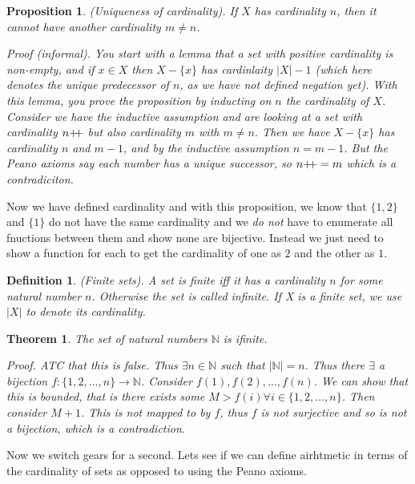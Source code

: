 \documentclass{article}
\newtheorem{definition}{Definition}[subsection]
\newtheorem{proposition}{Proposition}[subsection]
\newtheorem{theorem}{Theorem}[subsection]
\newcommand{\N}{\mathbb{N}}
\newcommand{\pp}{\mathbin{+\mkern-5mu+}}
\let\it\textit
\begin{document}
\begin{proposition}
	(Uniqueness of cardinality). If $X$ has cardinality $n$, then 
	it cannot have another cardinality $m \neq n$.

	\it{Proof} (informal). You start with a lemma that a set 
		with positive cardinality is non-empty, and if $x \in X$ 
		then $X - \{x\}$ has cardinlaity $|X| - 1$ (which here
		denotes the unique predecessor of $n$, as we have not
		defined negation yet). With this lemma, you prove the 
		proposition by inducting on $n$ the cardinality 
		of $X$. Consider we have the inductive assumption 
		and are looking at a set with cardinality $n\pp$ but
		also cardinality $m$ with $m \neq n$. Then we have
		$X - \{x\}$ has cardinality $n$ and $m-1$, and by the 
		inductive assumption $n=m-1$. But the Peano 
		axioms say each number has a unique successor, so $n\pp = m$
		which is a contradiciton.
\end{proposition}

Now we have defined cardinality and with this proposition, 
we know that $\{1,2\}$ and $\{1\}$ do not have the same cardinality 
and we \it{do not} have to enumerate all fnuctions between them 
and show none are bijective. Instead we just need to show 
a function for each to get the cardinality of one as $2$ 
and the other as $1$.

\begin{definition}
	(Finite sets). A set is finite iff it has a 
	cardinality $n$ for some natural number $n$.
	Otherwise the set is called infinite. If X is
	a finite set, we use $|X|$ to denote its 
	cardinality.
\end{definition}

\begin{theorem}
	The set of natural numbers $\N$ is ifinite.	

	\it{Proof}. ATC that this is false. Thus $\exists n \in \N$ 
	such that $|\N| = n$. Thus there $\exists$ a bijection 
	$f: \{1,2,\dots,n\} \to \N$. Consider $f(1), f(2), \dots, f(n)$. 
	We can show that this is bounded, that is there exists some $M > f(i)
	\forall i \in \{1,2,\dots,n\}$. Then consider $M+1$. This 
	is not mapped to by $f$, thus $f$ is not surjective and so 
	is not a bijection, which is a contradiction.
\end{theorem}

Now we switch gears for a second. Lets see if we can define airhtmetic 
in terms of the cardinality of sets as opposed to using the 
Peano axioms.
\end{document}
